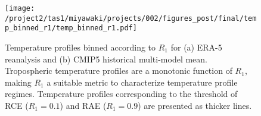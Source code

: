 \documentclass{ametsocV5}
\begin{document}




%

%

\begin{figure}
  \noindent\texttt{[image: /project2/tas1/miyawaki/projects/002/figures\_post/final/temp\_binned\_r1/temp\_binned\_r1.pdf]}\\
  \caption{Temperature profiles binned according to $R_{1}$ for (a) ERA-5 reanalysis and (b) CMIP5 historical multi-model mean. Tropospheric temperature profiles are a monotonic function of $R_{1}$, making $R_{1}$ a suitable metric to characterize temperature profile regimes. Temperature profiles corresponding to the threshold of RCE ($R_1=0.1$) and RAE ($R_1=0.9$) are presented as thicker lines.}
  \label{fig:temp-binned-r1}
\end{figure}
\end{document}
